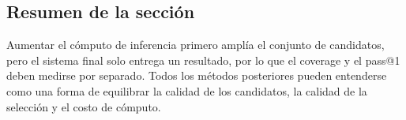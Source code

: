 \subsection{Resumen de la sección}

Aumentar el cómputo de inferencia primero amplía el conjunto de candidatos, pero el sistema final solo entrega un resultado, por lo que el coverage y el pass@1 deben medirse por separado. Todos los métodos posteriores pueden entenderse como una forma de equilibrar la calidad de los candidatos, la calidad de la selección y el costo de cómputo.

